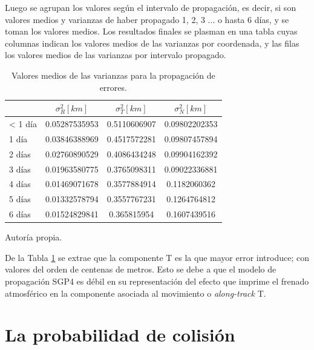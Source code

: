 Luego se agrupan los valores seg\'un el intervalo de propagaci\'on, es decir, si son valores medios y varianzas de haber propagado 1, 2, 3 ... o hasta 6 d\'ias, y se toman los valores medios. Los resultados finales se plasman en una tabla cuyas columnas indican los valores medios de las varianzas por coordenada, y las filas los valores medios de las varianzas por intervalo propagado.\\

\begin{table}[!h]
\caption[Tabla con los valores medios para la propagaci\'on de errores.]{Valores medios de las varianzas para la propagaci\'on de errores. }
\begin{tabular}{l c c c}
\hline \hline
\rowcolor{yellow!35}
&$\sigma^{2}_R [km]$ &$\sigma^{2}_T [km]$ &$\sigma^{2}_N [km]$\\
\hline \hline
< 1 d\'ia & 0.05287535953&0.5110606907&0.09802202353\\

1 d\'ia & 0.03846388969&0.4517572281&0.09807457894\\

2 d\'ias & 0.02760890529&0.4086434248&0.09904162392\\

3 d\'ias & 0.01963580775&0.3765098311&0.09022336881\\

4 d\'ias & 0.01469071678&0.3577884914&0.1182060362\\

5 d\'ias & 0.01332578794&0.3557767231&0.1264764812\\

6 d\'ias & 0.01524829841&0.365815954&0.1607439516\\
\hline
\end{tabular}
\label{tab:resultatabla0}
\begin{flushleft}
\small Autor\'ia propia.
\end{flushleft}
\end{table}

De la Tabla \ref{tab:resultatabla0} se extrae que la componente T es la que mayor error introduce; con valores del orden de centenas de metros. Esto se debe a que el modelo de propagaci\'on SGP4 es d\'ebil en su representaci\'on del efecto que imprime el frenado atmosf\'erico en la componente asociada al movimiento o {\it{along-track}} T. 

\section{La probabilidad de colisi\'on}\label{sec:probcol}

